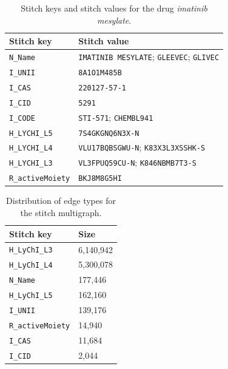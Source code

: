 \documentclass{bmcart}
\begin{document}
\begin{backmatter}
\begin{table}[ht!]
\caption{Stitch keys and stitch values for the
drug \emph{imatinib mesylate}.\label{tab:imatinib}}
\begin{tabular}{@{}ll@{}}\toprule
  Stitch key & Stitch value\\ \midrule
\texttt{N\_Name} & \texttt{IMATINIB MESYLATE}; \texttt{GLEEVEC}; \texttt{GLIVEC}\\
\texttt{I\_UNII} & \texttt{8A1O1M485B}\\
\texttt{I\_CAS} & \texttt{220127-57-1}\\
\texttt{I\_CID} & \texttt{5291}\\
\texttt{I\_CODE} & \texttt{STI-571}; \texttt{CHEMBL941}\\
\texttt{H\_LYCHI\_L5} & \texttt{7S4GKGNQ6N3X-N}\\
\texttt{H\_LYCHI\_L4} & \texttt{VLU17BQBSGWU-N}; \texttt{K83X3L3XSSHK-S}\\
\texttt{H\_LYCHI\_L3} & \texttt{VL3FPUQ59CU-N}; \texttt{K846NBMB7T3-S}\\
\texttt{R\_activeMoiety} & \texttt{BKJ8M8G5HI}\\ \bottomrule
\end{tabular}
\end{table}

\begin{table}[ht!]
\caption{Distribution of edge types for the stitch multigraph.\label{tab:stitch-keys}}
\begin{tabular}{@{}ll@{}}\toprule
Stitch key & Size\\ \midrule
\texttt{H\_LyChI\_L3}	& 6,140,942\\
\texttt{H\_LyChI\_L4} &	5,300,078\\
\texttt{N\_Name} &	177,446\\
\texttt{H\_LyChI\_L5} &	162,160\\
\texttt{I\_UNII} &	139,176\\
\texttt{R\_activeMoiety} & 14,940\\
\texttt{I\_CAS}	& 11,684\\
\texttt{I\_CID} &	2,044\\ \bottomrule
\end{tabular}
\end{table}


\end{backmatter}
\end{document}
